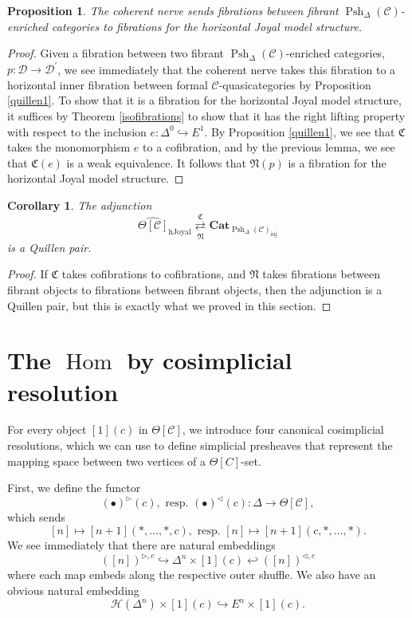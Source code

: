\documentclass{amsart}
\numberwithin{equation}{section}
\theoremstyle{plain}   %
\newtheorem{prop}[subsection]{Proposition}
\newtheorem{cor}[subsection]{Corollary}
\theoremstyle{remark}
\theoremstyle{plain}
\newcommand{\Cat}{\ensuremath{\mathbf{Cat}}}
\DeclareMathOperator{\Hom}{Hom}
\newcommand{\C}{\ensuremath{\mathcal{C}}}
\newcommand{\cellset}{\ensuremath{\widehat{\Theta[\mathcal{C}]}}}
\newcommand{\spsh}{\ensuremath{\operatorname{Psh}_\Delta(\mathcal{C})}}
\begin{document}
\begin{prop}
	The coherent nerve sends fibrations between fibrant \(\spsh\)-enriched categories to fibrations for the horizontal Joyal model structure.
\end{prop}
\begin{proof}
	Given a fibration between two fibrant \(\spsh\)-enriched categories, \(p:\mathcal{D}\to \mathcal{D}^\prime\), we see immediately that the coherent nerve takes this fibration to a horizontal inner fibration between formal \(\C\)-quasicategories by Proposition \ref{quillen1}.  To show that it is a fibration for the horizontal Joyal model structure, it suffices by Theorem \ref{isofibrations} to show that it has the right lifting property with respect to the inclusion \(e:\Delta^0 \hookrightarrow E^1\). By Proposition \ref{quillen1}, we see that \(\mathfrak{C}\) takes the monomorphism \(e\) to a cofibration, and by the previous lemma, we see that \(\mathfrak{C}(e)\) is a weak equivalence.  It follows that \(\mathfrak{N}(p)\) is a fibration for the horizontal Joyal model structure.
\end{proof}

\begin{cor}\label{horizquillen}
	The adjunction 
	\[\cellset_{\mathrm{hJoyal}} \underset{\mathfrak{N}}{\overset{\mathfrak{C}}{\rightleftarrows}} \Cat_{\spsh_{\mathrm{inj}}}\]
	is a Quillen pair.
\end{cor}
\begin{proof}
	If \(\mathfrak{C}\) takes cofibrations to cofibrations, and \(\mathfrak{N}\) takes fibrations between fibrant objects to fibrations between fibrant objects, then the adjunction is a Quillen pair, but this is exactly what we proved in this section.
\end{proof}

\section{The \(\Hom\) by cosimplicial resolution}
For every object \([1](c)\) in \(\Theta[\C]\), we introduce four canonical cosimplicial resolutions, which we can use to define simplicial presheaves that represent the mapping space between two vertices of a \(\Theta[C]\)-set.

First, we define the functor
\[(\bullet)^{\triangleright}(c),\text{ resp. }(\bullet)^{\triangleleft}(c): \Delta \to \Theta[\C],\]
which sends
\[[n]\mapsto [n+1](\ast,\dots,\ast,c), \text{ resp. } [n]\mapsto [n+1](c,\ast,\dots,\ast).\]
We see immediately that there are natural embeddings
\[([n])^{\triangleright,c} \hookrightarrow \Delta^n \times [1](c)  \hookleftarrow ([n])^{\triangleleft,c}\]
where each map embeds along the respective outer shuffle. We also have an obvious natural embedding
\[\mathscr{H}(\Delta^n)\times [1](c) \hookrightarrow E^n\times [1](c).\]
\end{document}
